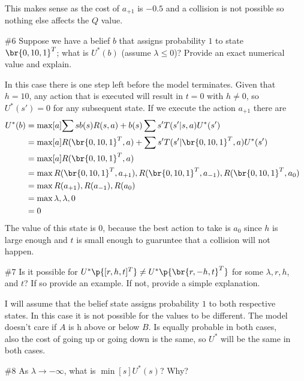 \documentclass[12pt, oneside]{article}
\begin{document}
\begin{enumerate}
    This makes sense as the cost of $a_{+1}$ is $-0.5$ and a collision is not
    possible so nothing else affects the $Q$ value.

  \item[\#6] %
    Suppose we have a belief $b$ that assigns probability $1$ to state
    $\br{0, 10, 1}^T$; what is $U^*(b)$ (assume $\lambda \le 0$)?
    Provide an exact numerical value and explain.

    In this case there is one step left before the model terminates.
    Given that $h = 10$, any action that is executed will result in $t = 0$ with
    $h \neq 0$, so $U^*(s') = 0$ for any subsequent state.
    If we execute the action $a_{+1}$ there are 
    \begin{align*}
      U^*(b) &= \max[a]{\sum{s}{}{b(s)R(s, a) + b(s)\sum{s'}{}{T(s'|s,a)U^*(s')}}} \\
      &= \max[a]{R(\br{0, 10, 1}^T, a) + \sum{s'}{}{T(s'|\br{0, 10, 1}^T,a)U^*(s')}} \\
      &= \max[a]{R(\br{0, 10, 1}^T, a)} \\
      &= \max{R(\br{0, 10, 1}^T, a_{+1}),R(\br{0, 10, 1}^T, a_{-1}), R(\br{0, 10, 1}^T, a_{0})} \\
      &= \max{R(a_{+1}),R(a_{-1}), R(a_{0})} \\
      &= \max{\lambda,\lambda, 0} \\
      &= 0 \\
    \end{align*}
    The value of this state is $0$, because the best action to take is $a_0$
    since $h$ is large enough and $t$ is small enough to guaruntee that a
    collision will not happen.

  \item[\#7] %
    Is it possible for $U^*\p{[r, h, t]^T} \neq U^*\p{\br{r, -h, t}^T}$ for some
    $\lambda, r, h$, and $t$?
    If so provide an example.
    If not, provide a simple explanation.

    I will assume that the belief state assigns probability $1$ to both
    respective states.
    In this case it is not possible for the values to be different.
    The model doesn't care if $A$ is h above or below $B$.
    Is equally probable in both cases, also the cost of going up or going down
    is the same, so $U^*$ will be the same in both cases.

  \item[\#8] %
    As $\lambda \to -\infty$, what is $\min[s]{U^*(s)}$?
    Why?


\end{enumerate}
\end{document}
